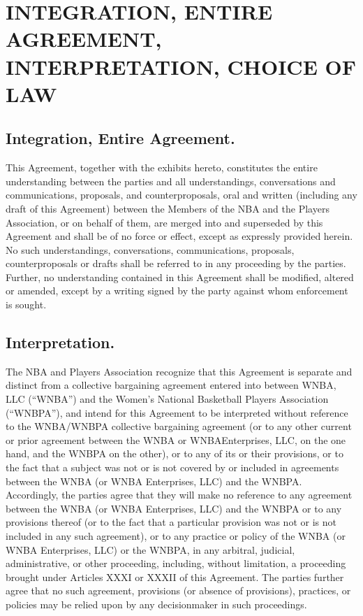 \documentclass[
]{book}
\begin{document}
\hypertarget{integration-entire-agreement-interpretation-choice-of-law}{%
\chapter{INTEGRATION, ENTIRE AGREEMENT, INTERPRETATION, CHOICE OF LAW}\label{integration-entire-agreement-interpretation-choice-of-law}}


\hypertarget{integration-entire-agreement.}{%
\section{Integration, Entire Agreement.}\label{integration-entire-agreement.}}

This Agreement, together with the exhibits hereto, constitutes the entire understanding between the parties and all understandings, conversations and communications, proposals, and counterproposals, oral and written (including any draft of this Agreement) between the Members of the NBA and the Players Association, or on behalf of them, are merged into and superseded by this Agreement and shall be of no force or effect, except as expressly provided herein. No such understandings, conversations, communications, proposals, counterproposals or drafts shall be referred to in any proceeding by the parties. Further, no understanding contained in this Agreement shall be modified, altered or amended, except by a writing signed by the party against whom enforcement is sought.

\hypertarget{interpretation.}{%
\section{Interpretation.}\label{interpretation.}}

The NBA and Players Association recognize that this Agreement is separate and distinct from a collective bargaining agreement entered into between WNBA, LLC (``WNBA'') and the Women's National Basketball Players Association (``WNBPA''), and intend for this Agreement to be interpreted without reference to the WNBA/WNBPA collective bargaining agreement (or to any other current or prior agreement between the WNBA or WNBAEnterprises, LLC, on the one hand, and the WNBPA on the other), or to any of its or their provisions, or to the fact that a subject was not or is not covered by or included in agreements between the WNBA (or WNBA Enterprises, LLC) and the WNBPA. Accordingly, the parties agree that they will make no reference to any agreement between the WNBA (or WNBA Enterprises, LLC) and the WNBPA or to any provisions thereof (or to the fact that a particular provision was not or is not included in any such agreement), or to any practice or policy of the WNBA (or WNBA Enterprises, LLC) or the WNBPA, in any arbitral, judicial, administrative, or other proceeding, including, without limitation, a proceeding brought under Articles XXXI or XXXII of this Agreement. The parties further agree that no such agreement, provisions (or absence of provisions), practices, or policies may be relied upon by any decisionmaker in such proceedings.
\end{document}
